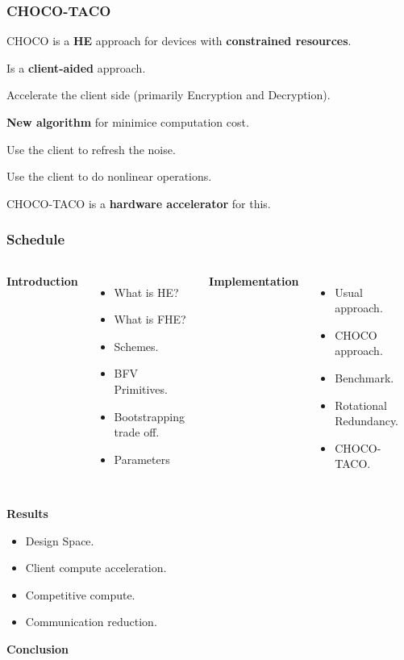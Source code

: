 \documentclass[10pt,handout]{beamer}
\begin{document}
\begin{frame}
    \frametitle{CHOCO-TACO}

    CHOCO is a \textbf{HE} approach for devices with \textbf{constrained resources}.

    Is a \textbf{client-aided} approach.
\pause

    Accelerate the client side (primarily Encryption and Decryption).

    \textbf{New algorithm} for minimice computation cost.

\pause
    Use the client to refresh the noise.

    Use the client to do nonlinear operations.

    CHOCO-TACO is a \textbf{hardware accelerator} for this.
\end{frame}
\begin{frame}[noframenumbering]
    \frametitle{Schedule}
\begin{columns}
\centering
    \textbf{Introduction}
    \begin{itemize}
        \item What is HE?
        \item What is FHE?
        \item Schemes.
        \item BFV Primitives.
        \item Bootstrapping trade off.
        \item Parameters
    \end{itemize}

\pause
\centering
    \textbf{Implementation}
    \begin{itemize}
        \item Usual approach.
        \item CHOCO approach.
        \item Benchmark.
        \item Rotational Redundancy.
        \item CHOCO-TACO.
    \end{itemize}
\end{columns}
\pause
\centering
    \textbf{Results}
  \begin{center}
    \begin{minipage}{0.5\textwidth}
      \begin{itemize}
        \item Design Space.
        \item Client compute acceleration.
        \item Competitive compute.
        \item Communication reduction.
      \end{itemize}
    \end{minipage}
  \end{center}
  \centering
    \textbf{Conclusion}
\end{frame}
\end{document}
